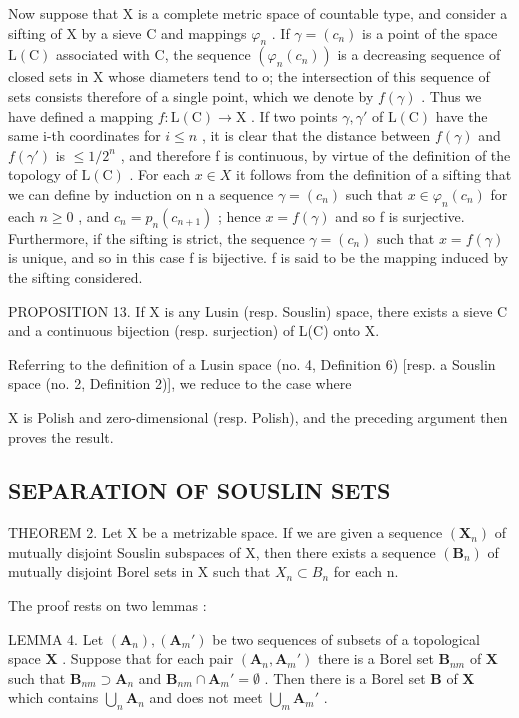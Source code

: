 Now suppose that X is a complete metric space of countable type, and consider a sifting of X by a sieve C and mappings \(\varphi_{n}\) . If \(\gamma = (c_{n})\) is a point of the space \(\mathrm{L}(\mathrm{C})\) associated with C, the sequence \((\varphi_{n}(c_{n}))\) is a decreasing sequence of closed sets in X whose diameters tend to o; the intersection of this sequence of sets consists therefore of a single point, which we denote by \(f(\gamma)\) . Thus we have defined a mapping \(f: \mathrm{L}(\mathrm{C}) \to \mathrm{X}\) . If two points \(\gamma, \gamma'\) of \(\mathrm{L}(\mathrm{C})\) have the same i-th coordinates for \(i \leqslant n\) , it is clear that the distance between \(f(\gamma)\) and \(f(\gamma')\) is \(\leqslant 1/2^{n}\) , and therefore f is continuous, by virtue of the definition of the topology of \(\mathrm{L}(\mathrm{C})\) . For each \(x \in X\) it follows from the definition of a sifting that we can define by induction on n a sequence \(\gamma = (c_{n})\) such that \(x \in \varphi_{n}(c_{n})\) for each \(n \geqslant 0\) , and \(c_{n} = p_{n}(c_{n+1})\) ; hence \(x = f(\gamma)\) and so f is surjective. Furthermore, if the sifting is strict, the sequence \(\gamma = (c_{n})\) such that \(x = f(\gamma)\) is unique, and so in this case f is bijective. f is said to be the mapping induced by the sifting considered.

PROPOSITION 13. If X is any Lusin (resp. Souslin) space, there exists a sieve C and a continuous bijection (resp. surjection) of L(C) onto X.

Referring to the definition of a Lusin space (no. 4, Definition 6) {[}resp. a Souslin space (no. 2, Definition 2){]}, we reduce to the case where

X is Polish and zero-dimensional (resp. Polish), and the preceding argument then proves the result.

\subsection{SEPARATION OF SOUSLIN SETS}

THEOREM 2. Let X be a metrizable space. If we are given a sequence \((\mathbf{X}_{n})\) of mutually disjoint Souslin subspaces of X, then there exists a sequence \((\mathbf{B}_{n})\) of mutually disjoint Borel sets in X such that \(X_{n} \subset B_{n}\) for each n.

The proof rests on two lemmas :

LEMMA 4. Let \((\mathbf{A}_n), (\mathbf{A}_m')\) be two sequences of subsets of a topological space \(\mathbf{X}\) . Suppose that for each pair \((\mathbf{A}_n, \mathbf{A}_m')\) there is a Borel set \(\mathbf{B}_{nm}\) of \(\mathbf{X}\) such that \(\mathbf{B}_{nm} \supset \mathbf{A}_n\) and \(\mathbf{B}_{nm} \cap \mathbf{A}_m' = \emptyset\) . Then there is a Borel set \(\mathbf{B}\) of \(\mathbf{X}\) which contains \(\bigcup_{n} \mathbf{A}_n\) and does not meet \(\bigcup_{m} \mathbf{A}_m'\) .

